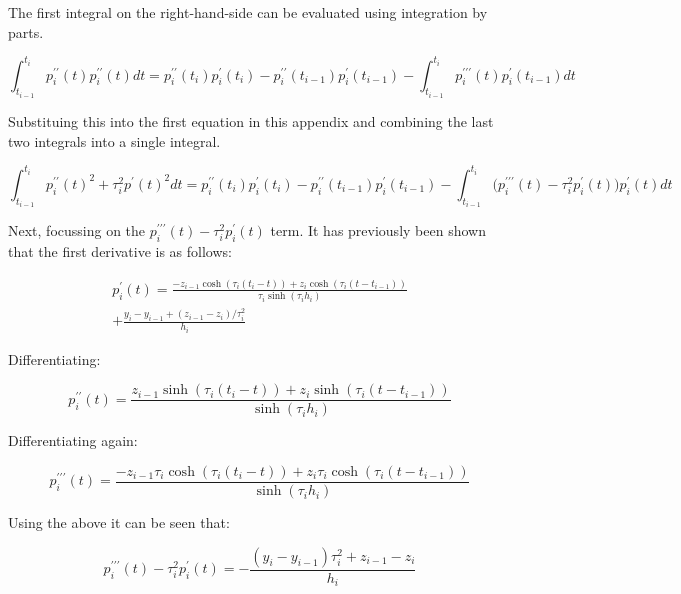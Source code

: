 \documentclass{article}
\begin{document}
The first integral on the right-hand-side can be evaluated using integration by parts.

\begin{equation}
    \int_{t_{i - 1}}^{t_i}p^{\prime\prime}_i(t) p^{\prime\prime}_i(t) dt = 
    p^{\prime\prime}_i(t_i) p^{\prime}_i(t_i) - p^{\prime\prime}_i(t_{i - 1}) p^{\prime}_i(t_{i - 1})
    - \int_{t_{i - 1}}^{t_i} p^{\prime\prime\prime}_i(t) p^{\prime}_i(t_{i - 1}) dt
\end{equation}

Substituing this into the first equation in this appendix and combining the last two integrals
into a single integral.

\begin{equation}
    \int_{t_{i - 1}}^{t_i}p^{\prime\prime}_i(t)^2 + \tau_i^2 p^{\prime}(t)^2 dt
    = p^{\prime\prime}_i(t_i) p^{\prime}_i(t_i) - p^{\prime\prime}_i(t_{i - 1}) p^{\prime}_i(t_{i - 1})
    - \int_{t_{i - 1}}^{t_i} \bigl( p^{\prime\prime\prime}_i(t) - \tau_i^2 p^{\prime}_i(t) \bigr) p^{\prime}_i(t) dt
\end{equation}

Next, focussing on the $p^{\prime\prime\prime}_i(t) - \tau_i^2 p^{\prime}_i(t)$ term. It has previously been
shown that the first derivative is as follows:

\begin{multline}
    p^\prime_i(t) = \frac{ -z_{i-1} \cosh(\tau_i (t_i - t)) + z_i \cosh(\tau_i (t - t_{i-1}))}{\tau_i \sinh(\tau_i h_i)}  \\
        + \frac{y_i - y_{i-1} +  (z_{i-1} - z_i)/\tau_i^2}{h_i}
\end{multline}

Differentiating:

\begin{equation}
    p^{\prime\prime}_i(t) = \frac{ z_{i-1} \sinh(\tau_i (t_i - t)) + z_i \sinh(\tau_i (t - t_{i-1}))}{\sinh(\tau_i h_i)}
\end{equation}

Differentiating again:

\begin{equation}
    p^{\prime\prime\prime}_i(t) = \frac{ -z_{i-1} \tau_i \cosh(\tau_i (t_i - t)) + z_i \tau_i \cosh(\tau_i (t - t_{i-1}))}{\sinh(\tau_i h_i)}
\end{equation}

Using the above it can be seen that:

\begin{equation}
    p^{\prime\prime\prime}_i(t) - \tau_i^2 p^{\prime}_i(t) =
    - \frac{(y_i - y_{i-1})\tau_i^2 +  z_{i-1} - z_i}{h_i}
\end{equation}
\end{document}
